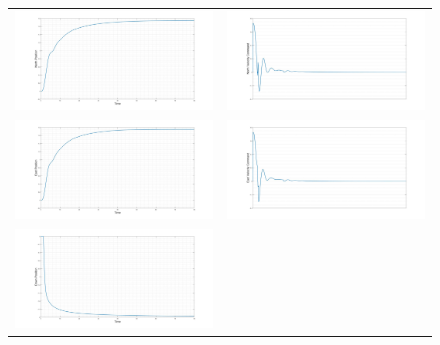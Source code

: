 		\begin{figure}[H]
			\begin{tabular}{c c}
				\centering
				{\includegraphics[width = 3in]{../References/Diagrams/ObAvoidNorth.jpg}} &
				{\includegraphics[width = 3in]{../References/Diagrams/ObAvoidVelNorth.jpg}}\\
				{\includegraphics[width = 3in]{../References/Diagrams/ObAvoidEast.jpg}} &
				{\includegraphics[width = 3in]{../References/Diagrams/ObAvoidVelEast.jpg}}\\
				{\includegraphics[width = 3in]{../References/Diagrams/ObAvoidDown.jpg}} &

\end{tabular}
\end{figure}
